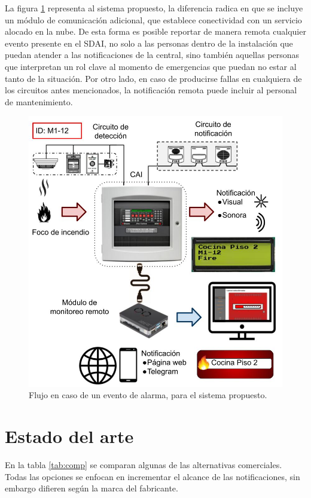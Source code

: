 La figura \ref{fig:flujo_prop} representa al sistema propuesto, la diferencia radica en que se incluye un módulo de comunicación adicional, que establece conectividad con un servicio alocado en la nube. De esta forma es posible reportar de manera remota cualquier evento presente en el SDAI, no solo a las personas dentro de la instalación que puedan atender a las notificaciones de la central, sino también aquellas personas que interpretan un rol clave al momento de emergencias que puedan no estar al tanto de la situación. Por otro lado, en caso de producirse fallas en cualquiera de los circuitos antes mencionados, la notificación remota puede incluir al personal de mantenimiento. 

\begin{figure}[ht]
    \centering
    \includegraphics[scale=.45]{./Figures/flujo_prop.jpg}
    \caption{Flujo en caso de un evento de alarma, para el sistema propuesto.}
    \label{fig:flujo_prop}
\end{figure}

\section{Estado del arte}
%

En la tabla \ref{tab:comp} se comparan algunas de las alternativas comerciales. Todas las opciones se enfocan en incrementar el alcance de las notificaciones, sin embargo difieren según la marca del fabricante.

